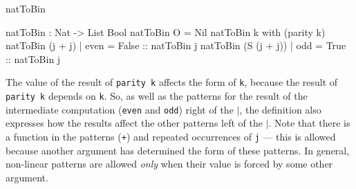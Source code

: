 \begin{SaveVerbatim}{natToBin}

natToBin : Nat -> List Bool
natToBin O = Nil
natToBin k with (parity k)
   natToBin (j + j)     | even = False :: natToBin j
   natToBin (S (j + j)) | odd  = True  :: natToBin j

\end{SaveVerbatim}

\noindent
The value of the result of \texttt{parity k} affects the form of \texttt{k}, 
because the result
of \texttt{parity k} depends on \texttt{k}. 
So, as well as the patterns for the result of the
intermediate computation (\texttt{even} and \texttt{odd}) right of the 
\texttt{$\mid$}, the definition also expresses how
the results affect the other patterns left of the $\mid$. Note that there is a
function in the patterns (\texttt{+}) and repeated occurrences of \texttt{j} --- 
this is allowed
because another argument has determined the form of these patterns. In general,
non-linear patterns are allowed \emph{only} when their value is forced by
some other argument.


